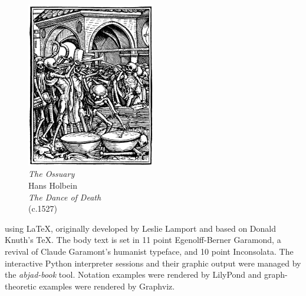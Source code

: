 \newpage

\begin{figure}
    \vspace{50pt}
    \centering
    \includegraphics[width=0.5\textwidth]{assets/holbein-ossuary.jpg}
    \\
    \emph{The Ossuary}
    \\
    Hans Holbein
    \\
    \emph{The Dance of Death}
    \\
    (c.1527)
\end{figure}

\begin{center}

\parbox{220pt}{

 using \LaTeX, originally developed by
Leslie Lamport and based on Donald Knuth's \TeX. The body text is set in 11
point Egenolff-Berner Garamond, a revival of Claude Garamont's humanist
typeface, and 10 point Inconsolata. The interactive Python interpreter sessions
and their graphic output were managed by the \emph{abjad-book} tool. Notation
examples were rendered by LilyPond and graph-theoretic examples were rendered
by Graphviz.

}

\end{center}
